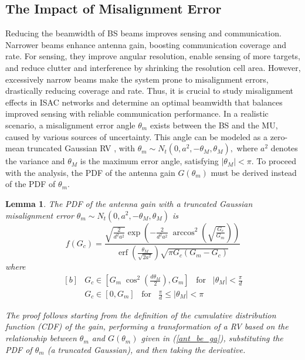 \documentclass[journal]{IEEEtran}
\newtheorem{lemma}{\textbf{Lemma}}
\DeclareMathOperator\erf{erf}
\begin{document}
\subsection{The Impact of Misalignment Error}


Reducing the beamwidth of BS beams improves sensing and communication. Narrower beams enhance antenna gain, boosting communication coverage and rate. For sensing, they improve angular resolution, enable sensing of more targets, and reduce clutter and interference by shrinking the resolution cell area. However, excessively narrow beams make the system prone to misalignment errors, drastically reducing coverage and rate. Thus, it is crucial to study misalignment effects in ISAC networks and determine an optimal beamwidth that balances improved sensing with reliable communication performance.
In a realistic scenario, a misalignment error angle \(\theta_m\) exists between the BS and the MU, caused by various sources of uncertainty. This angle can be modeled as a zero-mean truncated Gaussian RV \cite{bahadori2019device}, with 
$\theta_m \sim N_t(0, a^2, -\theta_M, \theta_M),$
where \(a^2\) denotes the variance and \(\theta_M\) is the maximum error angle, satisfying \(|\theta_M| < \pi\). To proceed with the analysis, the PDF of the antenna gain \(G(\theta_m)\) must be derived instead of the PDF of \(\theta_m\).

\begin{lemma} \label{lemma_gain_mis}
The PDF of the antenna gain with a truncated Gaussian misalignment error  $\theta_m \sim N_t(0,a^2,- \theta_M ,\theta_M )$  is 
\begin{equation}\label{pdf_gain_ant}
 f\left(G_c\right)= \frac{\sqrt{\frac{2}{d^2 a^2}}\exp{\left(-\frac{2}{d^2 a^2}\;\arccos^2\left(\sqrt{\frac{G_c}{G_m}}\right)\right)}}{\erf{\left(\frac{\theta_M}{\sqrt{2 a^2}}\right)} \sqrt{\pi G_c \left(G_m - G_c\right) }}
 \end{equation}
where 
  \[
  \begin{aligned}[b]
 &G_c \in \left[G_m \; \cos^2 \left(\frac{d\theta_M}{2}\right),G_m\right] \;\;\; \text{for}\;\;\; |\theta_M|< \frac{\pi}{d}\\
&G_c \in \left[0,G_m\right]  \;\;\; \text{for}\;\;\; \frac{\pi}{d} \leq |\theta_M| < \pi 
\end{aligned}
\]
\begin{IEEEproof}
The proof follows starting from the definition of the cumulative distribution function (CDF) of the gain, performing a transformation of a RV based on the relationship between \(\theta_m\) and \(G(\theta_m)\) given in (\ref{ant_be_ga}), substituting the PDF of \(\theta_m\) (a truncated Gaussian), and then taking the derivative.
\end{IEEEproof}
\end{lemma}
\end{document}
